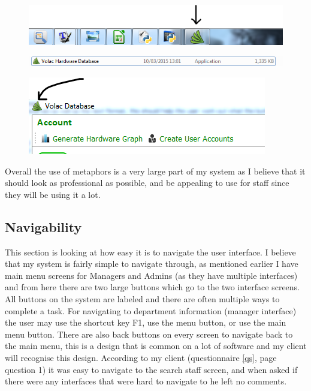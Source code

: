 \begin{figure}[H]
    \includegraphics[width=\textwidth]{./Evaluation/Images/volacicon.png}
\end{figure}

\begin{figure}[H]
    \includegraphics[width=\textwidth]{./Evaluation/Images/volacicon2.png}
\end{figure}

\begin{figure}[H]
    \includegraphics[width=\textwidth]{./Evaluation/Images/volacicon3.png}
\end{figure}

Overall the use of metaphors is a very large part of my system as I believe that it should look as professional as possible, and be appealing to use for staff since they will be using it a lot.

\subsection{Navigability}

This section is looking at how easy it is to navigate the user interface. I believe that my system is fairly simple to navigate through, as mentioned earlier I have main menu screens for Managers and Admins (as they have multiple interfaces) and from here there are two large buttons which go to the two interface screens. All buttons on the system are labeled and there are often multiple ways to complete a task. For navigating to department information (manager interface) the user may use the shortcut key F1, use the menu button, or use the main menu button. There are also back buttons on every screen to navigate back to the main menu, this is a design that is common on a lot of software and my client will recognise this design. According to my client (questionnaire \ref{qs}, page \pageref{qs} question 1) it was easy to navigate to the search staff screen, and when asked if there were any interfaces that were hard to navigate to he left no comments. 

